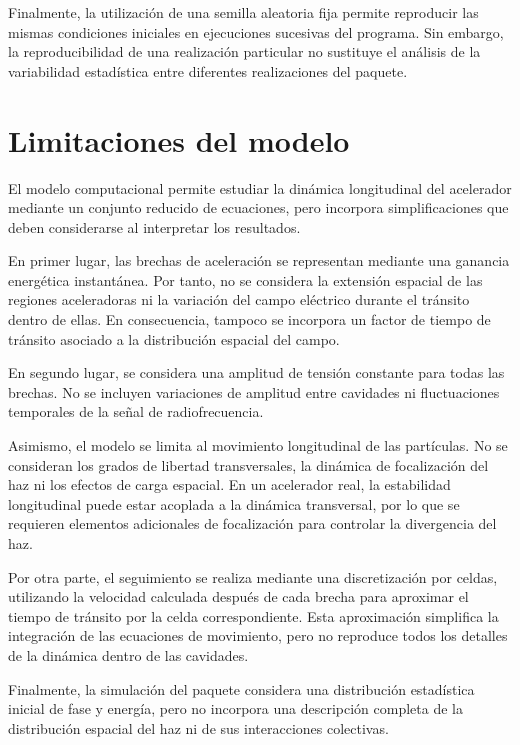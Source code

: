 Finalmente, la utilización de una semilla aleatoria fija permite reproducir las mismas condiciones iniciales en ejecuciones sucesivas del programa. Sin embargo, la reproducibilidad de una realización particular no sustituye el análisis de la variabilidad estadística entre diferentes realizaciones del paquete.

\section{Limitaciones del modelo}

El modelo computacional permite estudiar la dinámica longitudinal del acelerador mediante un conjunto reducido de ecuaciones, pero incorpora simplificaciones que deben considerarse al interpretar los resultados.

En primer lugar, las brechas de aceleración se representan mediante una ganancia energética instantánea. Por tanto, no se considera la extensión espacial de las regiones aceleradoras ni la variación del campo eléctrico durante el tránsito dentro de ellas. En consecuencia, tampoco se incorpora un factor de tiempo de tránsito asociado a la distribución espacial del campo.

En segundo lugar, se considera una amplitud de tensión constante para todas las brechas. No se incluyen variaciones de amplitud entre cavidades ni fluctuaciones temporales de la señal de radiofrecuencia.

Asimismo, el modelo se limita al movimiento longitudinal de las partículas. No se consideran los grados de libertad transversales, la dinámica de focalización del haz ni los efectos de carga espacial. En un acelerador real, la estabilidad longitudinal puede estar acoplada a la dinámica transversal, por lo que se requieren elementos adicionales de focalización para controlar la divergencia del haz.

Por otra parte, el seguimiento se realiza mediante una discretización por celdas, utilizando la velocidad calculada después de cada brecha para aproximar el tiempo de tránsito por la celda correspondiente. Esta aproximación simplifica la integración de las ecuaciones de movimiento, pero no reproduce todos los detalles de la dinámica dentro de las cavidades.

Finalmente, la simulación del paquete considera una distribución estadística inicial de fase y energía, pero no incorpora una descripción completa de la distribución espacial del haz ni de sus interacciones colectivas.

